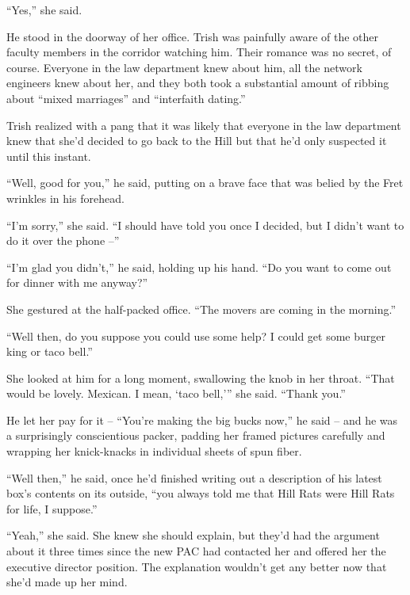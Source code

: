 “Yes,” she said.

He stood in the doorway of her office. Trish was painfully aware of the 
other faculty members in the corridor watching him. Their romance was 
no secret, of course. Everyone in the law department knew about him, 
all the network engineers knew about her, and they both took a 
substantial amount of ribbing about “mixed marriages” and 
“interfaith dating.”

Trish realized with a pang that it was likely that everyone in the law 
department knew that she'd decided to go back to the Hill but that he'd 
only suspected it until this instant.

“Well, good for you,” he said, putting on a brave face that was 
belied by the Fret wrinkles in his forehead.

“I'm sorry,” she said. “I should have told you once I decided, 
but I didn't want to do it over the phone --”

“I'm glad you didn't,” he said, holding up his hand. “Do you want 
to come out for dinner with me anyway?”

She gestured at the half-packed office. “The movers are coming in the 
morning.”

“Well then, do you suppose you could use some help? I could get some 
burger king or taco bell.”

She looked at him for a long moment, swallowing the knob in her throat. 
“That would be lovely. Mexican. I mean, `taco bell,'” she said. 
“Thank you.”

He let her pay for it -- “You're making the big bucks now,” he said 
-- and he was a surprisingly conscientious packer, padding her framed 
pictures carefully and wrapping her knick-knacks in individual sheets 
of spun fiber.

“Well then,” he said, once he'd finished writing out a description 
of his latest box's contents on its outside, “you always told me that 
Hill Rats were Hill Rats for life, I suppose.”

“Yeah,” she said. She knew she should explain, but they'd had the 
argument about it three times since the new PAC had contacted her and 
offered her the executive director position. The explanation wouldn't 
get any better now that she'd made up her mind.

